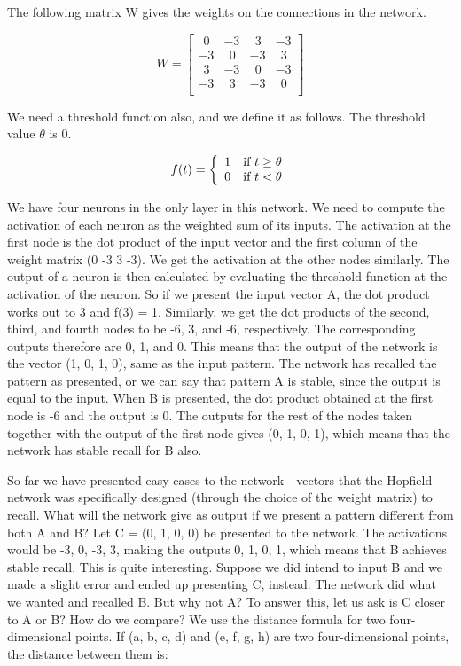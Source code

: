 \documentclass[12pt, right open]{memoir}
\newcommand{\matplus}
{
~~
}
\begin{document}
The following matrix W gives the weights on the connections in the network.

\[ 
W = \begin{bmatrix}
 \matplus0 & -3 &  \matplus3 & -3 \\
-3 &  \matplus0 & -3 &  \matplus3 \\
 \matplus3 & -3 &  \matplus0 & -3 \\
-3 &  \matplus3 & -3 &  \matplus0 \\
\end{bmatrix}
\]

We need a threshold function also, and we define it as follows. The threshold value $\theta$ is 0.

\[ f(t) = \left\{ 
                  \begin{array}{l l}
                   1 & \mbox{if $t \geq \theta$}\\
                   0 & \mbox{if $t < \theta$}
                  \end{array} 
          \right. 
\]
 
 
 We have four neurons in the only layer in this network. We need to compute
the activation of each neuron as the weighted sum of its inputs. The activation
at the first node is the dot product of the input vector and the first column of
the weight matrix (0 -3 3 -3). We get the activation at the other nodes
similarly. The output of a neuron is then calculated by evaluating the threshold
function at the activation of the neuron. So if we present the input vector A,
the dot product works out to 3 and f(3) = 1. Similarly, we get the dot products
of the second, third, and fourth nodes to be -6, 3, and -6, respectively. The
corresponding outputs therefore are 0, 1, and 0. This means that the output of
the network is the vector (1, 0, 1, 0), same as the input pattern. The network
has recalled the pattern as presented, or we can say that pattern A is stable,
since the output is equal to the input. When B is presented, the dot product
obtained at the first node is -6 and the output is 0. The outputs for the rest of
the nodes taken together with the output of the first node gives (0, 1, 0, 1),
which means that the network has stable recall for B also.

So far we have presented easy cases to the network—vectors that the Hopfield
network was specifically designed (through the choice of the weight matrix) to
recall. What will the network give as output if we present a pattern different
from both A and B? Let C = (0, 1, 0, 0) be presented to the network. The
activations would be -3, 0, -3, 3, making the outputs 0, 1, 0, 1, which means
that B achieves stable recall. This is quite interesting. Suppose we did intend to
input B and we made a slight error and ended up presenting C, instead. The
network did what we wanted and recalled B. But why not A? To answer this,
let us ask is C closer to A or B? How do we compare? We use the distance
formula for two four-dimensional points. If (a, b, c, d) and (e, f, g, h) are two
four-dimensional points, the distance between them is:
\end{document}
